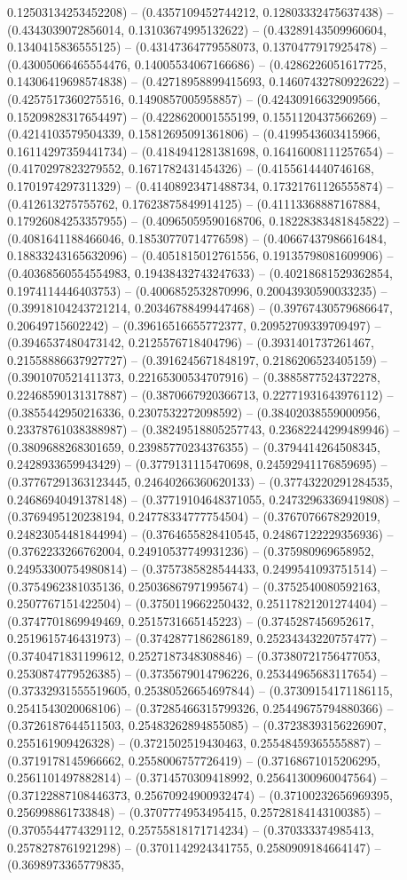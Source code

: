 0.12503134253452208) -- (0.4357109452744212, 0.12803332475637438) -- (0.4343039072856014, 0.13103674995132622) -- (0.43289143509960604, 0.1340415836555125) -- (0.43147364779558073, 0.1370477917925478) -- (0.43005066465554476, 0.14005534067166686) -- (0.4286226051617725, 0.14306419698574838) -- (0.42718958899415693, 0.14607432780922622) -- (0.4257517360275516, 0.1490857005958857) -- (0.42430916632909566, 0.15209828317654497) -- (0.4228620001555199, 0.1551120437566269) -- (0.4214103579504339, 0.15812695091361806) -- (0.4199543603415966, 0.16114297359441734) -- (0.4184941281381698, 0.16416008111257654) -- (0.4170297823279552, 0.1671782431454326) -- (0.4155614440746168, 0.1701974297311329) -- (0.41408923471488734, 0.17321761126555874) -- (0.412613275755762, 0.17623875849914125) -- (0.41113368887167884, 0.17926084253357955) -- (0.40965059590168706, 0.18228383481845822) -- (0.4081641188466046, 0.18530770714776598) -- (0.40667437986616484, 0.18833243165632096) -- (0.4051815012761556, 0.19135798081609906) -- (0.40368560554554983, 0.19438432743247633) -- (0.40218681529362854, 0.1974114446403753) -- (0.4006852532870996, 0.20043930590033235) -- (0.39918104243721214, 0.20346788499447468) -- (0.39767430579686647, 0.20649715602242) -- (0.39616516655772377, 0.20952709339709497) -- (0.3946537480473142, 0.2125576718404796) -- (0.3931401737261467, 0.21558886637927727) -- (0.3916245671848197, 0.2186206523405159) -- (0.3901070521411373, 0.22165300534707916) -- (0.3885877524372278, 0.22468590131317887) -- (0.3870667920366713, 0.22771931643976112) -- (0.3855442950216336, 0.2307532272098592) -- (0.38402038559000956, 0.23378761038388987) -- (0.38249518805257743, 0.23682244299489946) -- (0.3809688268301659, 0.23985770234376355) -- (0.3794414264508345, 0.2428933659943429) -- (0.3779131115470698, 0.24592941176859695) -- (0.37767291363123445, 0.24640266360620133) -- (0.37743220291284535, 0.24686940491378148) -- (0.37719104648371055, 0.24732963369419808) -- (0.3769495120238194, 0.24778334777754504) -- (0.3767076678292019, 0.24823054481844994) -- (0.3764655828410545, 0.24867122229356936) -- (0.3762233266762004, 0.24910537749931236) -- (0.375980969658952, 0.24953300754980814) -- (0.3757385828544433, 0.2499541093751514) -- (0.3754962381035136, 0.25036867971995674) -- (0.3752540080592163, 0.2507767151422504) -- (0.3750119662250432, 0.25117821201274404) -- (0.3747701869949469, 0.2515731665145223) -- (0.3745287456952617, 0.2519615746431973) -- (0.3742877186286189, 0.25234343220757477) -- (0.3740471831199612, 0.2527187348308846) -- (0.37380721756477053, 0.2530874779526385) -- (0.3735679014796226, 0.25344965683117654) -- (0.37332931555519605, 0.25380526654697844) -- (0.37309154171186115, 0.2541543020068106) -- (0.37285466315799326, 0.25449675794880366) -- (0.3726187644511503, 0.25483262894855085) -- (0.37238393156226907, 0.255161909426328) -- (0.3721502519430463, 0.25548459365555887) -- (0.3719178145966662, 0.2558006757726419) -- (0.37168671015206295, 0.2561101497882814) -- (0.3714570309418992, 0.25641300960047564) -- (0.37122887108446373, 0.25670924900932474) -- (0.37100232656969395, 0.256998861733848) -- (0.3707774953495415, 0.25728184143100385) -- (0.3705544774329112, 0.25755818171714234) -- (0.370333374985413, 0.2578278761921298) -- (0.3701142924341755, 0.2580909184664147) -- (0.3698973365779835, 